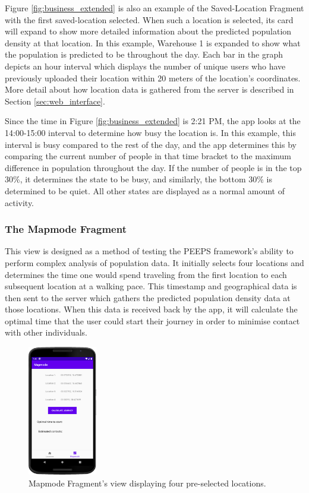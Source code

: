 Figure \ref{fig:business_extended} is also an example of the Saved-Location Fragment with the first saved-location selected. When such a location is selected, its card will expand to show more detailed information about the predicted population density at that location. In this example, Warehouse 1 is expanded to show what the population is predicted to be throughout the day. Each bar in the graph depicts an hour interval which displays the number of unique users who have previously uploaded their location within 20 meters of the location's coordinates. More detail about how location data is gathered from the server is described in Section \ref{sec:web_interface}.  

Since the time in Figure \ref{fig:business_extended} is 2:21 PM, the app looks at the 14:00-15:00 interval to determine how busy the location is. In this example, this interval is busy compared to the rest of the day, and the app determines this by comparing the current number of people in that time bracket to the maximum difference in population throughout the day. If the number of people is in the top 30\%, it determines the state to be busy, and similarly, the bottom 30\% is determined to be quiet. All other states are displayed as a normal amount of activity. 

\subsubsection{The Mapmode Fragment}

This view is designed as a method of testing the PEEPS framework's ability to perform complex analysis of population data. It initially selects four locations and determines the time one would spend traveling from the first location to each subsequent location at a walking pace. This timestamp and geographical data is then sent to the server which gathers the predicted population density data at those locations. When this data is received back by the app, it will calculate the optimal time that the user could start their journey in order to minimise contact with other individuals.

\begin{figure}[ht]
    \centering
    \includegraphics[width=0.268\textwidth]{figures/MapmodeDesign.png}
    \caption{Mapmode Fragment's view displaying four pre-selected locations.}
    \label{fig:mapmode_design}
\end{figure}

